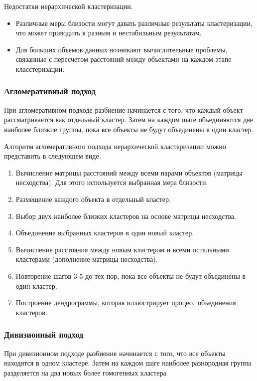 Недостатки иерархической кластеризации.

\begin{itemize}
    \item Различные меры близости могут давать различные результаты кластеризации, что может приводить к разным и нестабильным результатам.
    \item Для больших объемов данных возникают вычислительные проблемы, связанные с пересчетом расстояний между объектами на каждом этапе класстеризации.
\end{itemize}

\subsubsection{Агломеративный подход}

При агломеративном подходе \cite{HierarchicalСlustering} разбиение начинается с того, что каждый объект рассматривается как отдельный кластер. Затем на каждом шаге объединяются две наиболее близкие группы, пока все объекты не будут объединены в один кластер. 

Алгоритм агломеративного подхода иерархической кластеризации можно представить в следующем виде.

\begin{enumerate}
    \item Вычисление матрицы расстояний между всеми парами объектов (матрицы несходства). Для этого используется выбранная мера близости.
    \item Размещение каждого объекта в отдельный кластер.
    \item Выбор двух наиболее близких кластеров на основе матрицы несходства.
    \item Объединение выбранных кластеров в один новый кластер.
    \item Вычисление расстояния между новым кластером и всеми остальными кластерами (дополнение матрицы несходства).
    \item Повторение шагов 3-5 до тех пор, пока все объекты не будут объединены в один кластер.
    \item Построение дендрограммы, которая иллюстрирует процесс объединения кластеров.
\end{enumerate}

\subsubsection{Дивизионный подход}

При дивизионном подходе \cite{HierarchicalСlustering} разбиение начинается с того, что все объекты находятся в одном кластере. Затем на каждом шаге наиболее разнородная группа разделяется на два новых более гомогенных кластера. 

